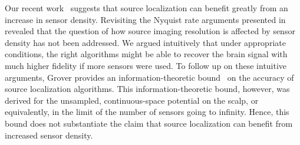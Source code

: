 \documentclass[conference,letterpaper]{IEEEtran}
\begin{document}
Our recent work~\cite{Grover2016Information} suggests that source localization
can benefit greatly from an increase in sensor density. Revisiting the Nyquist
rate arguments presented in~\cite{Nunez2006Electric} revealed that the question
of how source imaging resolution is affected by sensor density has not been
addressed. We argued intuitively that under appropriate conditions, the right
algorithms might be able to recover the brain signal with much higher fidelity
if more sensors were used. To follow up on these intuitive arguments, Grover
provides an information-theoretic bound~\cite{Grover2016Fundamental} on the
accuracy of source localization algorithms. This information-theoretic bound,
however, was derived for the unsampled, continuous-space potential on the
scalp, or equivalently, in the limit of the number of sensors going to
infinity. Hence, this bound does not substantiate the claim that source
localization can benefit from increased sensor density.

\end{document}
